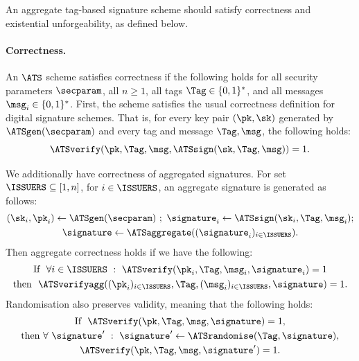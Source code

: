 An aggregate tag-based signature scheme should satisfy correctness and
existential unforgeability, as defined below.

\paragraph{Correctness.} An $\ATS$ scheme satisfies correctness if the
following holds for all security parameters $\secparam$, all $n \geq 1$, all
tags $\Tag \in \{0,1\}^*$, and all messages $\msg_i \in \{0,1\}^*$. First,
the scheme satisfies the usual correctness definition for digital signature
schemes. That is, for every key pair $(\pk,\sk)$ generated by $\ATSgen(\secparam)$ and
every tag and message $\Tag, \msg$, the following holds:
%
\begin{equation*}
%
  \ATSverify(\pk, \Tag, \msg, \ATSsign(\sk, \Tag, \msg)) = 1.
%
\end{equation*}
%

We additionally have correctness of aggregated signatures.  For set $\ISSUERS
\subseteq [1, n]$, for $i \in \ISSUERS$, an aggregate signature is generated as
follows:
%
\begin{gather*}
%
  (\sk_i, \pk_i) \gets \ATSgen(\secparam) \ ; \  \signature_i \gets
\ATSsign(\sk_i, \Tag, \msg_i) ; \\ \signature \gets
\ATSaggregate((\signature_i)_{i \in \ISSUERS}).
\end{gather*}
%
Then aggregate correctness holds if we have the following:
\begin{gather*}
%
  \text{If } \ \forall i \in \ISSUERS \ : \ \ATSverify(\pk_i, \Tag, \msg_i,
\signature_i) = 1 \\ \text{then } \ \ATSverifyagg((\pk_i)_{i \in \ISSUERS},
\Tag, (\msg_i)_{i \in \ISSUERS}, \signature) = 1.
\end{gather*}
%
Randomisation also preserves validity, meaning that the following holds:
\begin{gather*}
%
  \text{If } \ \ATSverify(\pk, \Tag, \msg, \signature) = 1, \\ \text{then }
\forall \ \signature' \ : \  \signature' \leftarrow \ATSrandomise(\Tag,
\signature), \\ \ATSverify(\pk, \Tag, \msg, \signature') = 1.
\end{gather*}
%

